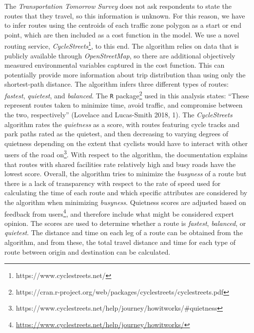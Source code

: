\documentclass[smallextended]{svjour3}       %
\begin{document}
The \emph{Transportation Tomorrow Survey} does not ask respondents to
state the routes that they travel, so this information is unknown. For
this reason, we have to infer routes using the centroids of each traffic
zone polygon as a start or end point, which are then included as a cost
function in the model. We use a novel routing service,
\emph{CycleStreets}\footnote{https://www.cyclestreets.net/}, to this
end. The algorithm relies on data that is publicly available through
\emph{OpenStreetMap}, so there are additional objectively measured
environmental variables captured in the cost function. This can
potentially provide more information about trip distribution than using
only the shortest-path distance. The algorithm infers three different
types of routes: \emph{fastest}, \emph{quietest}, and \emph{balanced}.
The \texttt{R}
package\footnote{https://cran.r-project.org/web/packages/cyclestreets/cyclestreets.pdf}
used in this analysis states: ``These represent routes taken to minimize
time, avoid traffic, and compromise between the two, respectively''
(Lovelace and Lucas-Smith 2018, 1). The \emph{CycleStreets} algorithm
rates the \emph{quietness} as a score, with routes featuring cycle
tracks and park paths rated as the quietest, and then decreasing to
varying degrees of quietness depending on the extent that cyclists would
have to interact with other users of the road
on\footnote{https://www.cyclestreets.net/help/journey/howitworks/\#quietness}.
With respect to the algorithm, the documentation explains that routes
with shared facilities rate relatively high and busy roads have the
lowest score. Overall, the algorithm tries to minimize the
\emph{busyness} of a route but there is a lack of transparency with
respect to the rate of speed used for calculating the time of each route
and which specific attributes are considered by the algorithm when
minimizing \emph{busyness}. Quietness scores are adjusted based on
feedback from
users\footnote{\url{https://www.cyclestreets.net/help/journey/howitworks/}},
and therefore include what might be considered expert opinion. The
scores are used to determine whether a route is \emph{fastest},
\emph{balanced}, or \emph{quietest}. The distance and time on each leg
of a route can be obtained from the algorithm, and from these, the total
travel distance and time for each type of route between origin and
destination can be calculated.
\end{document}
